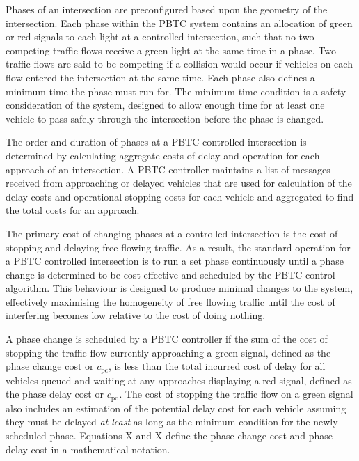 Phases of an intersection are preconfigured based upon the geometry of the intersection. Each phase within the PBTC system contains an allocation of green or red signals to each light at a controlled intersection, such that no two competing traffic flows receive a green light at the same time in a phase. Two traffic flows are said to be competing if a collision would occur if vehicles on each flow entered the intersection at the same time. Each phase also defines a minimum time the phase must run for.  The minimum time condition is a safety consideration of the system, designed to allow enough time for at least one vehicle to pass safely through the intersection before the phase is changed. 

The order and duration of phases at a PBTC controlled intersection is determined by calculating aggregate costs of delay and operation for each approach of an intersection. A PBTC controller maintains a list of messages received from approaching or delayed vehicles that are used for calculation of the delay costs and operational stopping costs for each vehicle and aggregated to find the total costs for an approach. 

The primary cost of changing phases at a controlled intersection is the cost of stopping and delaying free flowing traffic. As a result, the standard operation for a PBTC controlled intersection is to run a set phase continuously until a phase change is determined to be cost effective and scheduled by the PBTC control algorithm. This behaviour is designed to produce minimal changes to the system, effectively maximising the homogeneity of free flowing traffic until the cost of interfering becomes low relative to the cost of doing nothing. 

A phase change is scheduled by a PBTC controller if the sum of the cost of stopping the traffic flow currently approaching a green signal, defined as the phase change cost or $c_\text{pc}$, is less than the total incurred cost of delay for all vehicles queued and waiting at any approaches displaying a red signal, defined as the phase delay cost or $c_\text{pd}$. The cost of stopping the traffic flow on a green signal also includes an estimation of the potential delay cost for each vehicle assuming they must be delayed \emph{at least} as long as the minimum condition for the newly scheduled phase. Equations X and X define the phase change cost and phase delay cost in a mathematical notation. 

